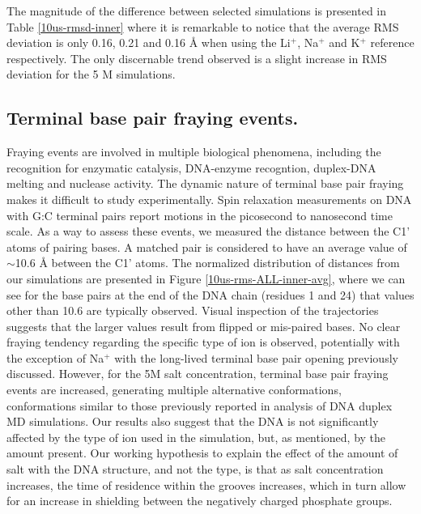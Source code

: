 \documentclass[9pt,lessons]{livecoms}
\begin{document}
The magnitude of the difference between selected simulations is
presented in Table \ref{10us-rmsd-inner} where it is remarkable to
notice that the average RMS deviation is only 0.16, 0.21 and 0.16 Å
when using the Li$^{+}$, Na$^{+}$ and K$^{+}$ reference
respectively. The only discernable trend observed is a slight increase
in RMS deviation for the 5 M simulations.

\subsection{Terminal base pair fraying events.}

Fraying events are involved in multiple biological phenomena,
including the recognition for enzymatic catalysis, DNA-enzyme
recogntion, duplex-DNA melting and nuclease
activity\cite{Zgarbova2014}. The dynamic nature of terminal base pair
fraying makes it difficult to study experimentally.  Spin relaxation
measurements on DNA with G:C terminal pairs report motions in the
picosecond to nanosecond time scale\cite{fray09,fray12}.  As a way to
assess these events, we measured the distance between the C1' atoms of
pairing bases. A matched pair is considered to have an average value
of $\sim$10.6 Å between the C1' atoms. The normalized distribution of
distances from our simulations are presented in Figure
\ref{10us-rms-ALL-inner-avg}, where we can see for the base pairs at
the end of the DNA chain (residues 1 and 24) that values other than
10.6 are typically observed.  Visual inspection of the trajectories
suggests that the larger values result from flipped or mis-paired
bases. No clear fraying tendency regarding the specific type of ion is
observed, potentially with the exception of Na$^{+}$ with the
long-lived terminal base pair opening previously discussed. However,
for the 5M salt concentration, terminal base pair fraying events are
increased, generating multiple alternative conformations,
conformations similar to those previously reported in analysis of DNA
duplex MD simulations\cite{Zgarbova2014}.  Our results also suggest
that the DNA is not significantly affected by the type of ion used in
the simulation, but, as mentioned, by the amount present. Our working
hypothesis to explain the effect of the amount of salt with the DNA
structure, and not the type, is that as salt concentration increases,
the time of residence within the grooves increases, which in turn
allow for an increase in shielding between the negatively charged
phosphate groups.
\end{document}
